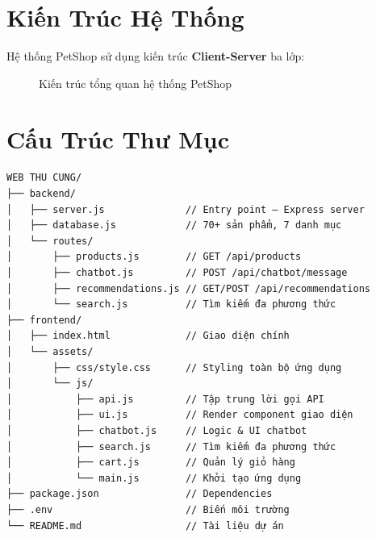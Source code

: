 \documentclass[12pt, a4paper]{report}
\begin{document}
\section{Kiến Trúc Hệ Thống}

Hệ thống PetShop sử dụng kiến trúc \textbf{Client-Server} ba lớp:

\begin{figure}[H]
    \centering
    \caption{Kiến trúc tổng quan hệ thống PetShop}
\end{figure}

\section{Cấu Trúc Thư Mục}

\begin{lstlisting}[style=jsStyle, caption={Cấu trúc thư mục dự án}]
WEB THU CUNG/
├── backend/
│   ├── server.js              // Entry point – Express server
│   ├── database.js            // 70+ sản phẩm, 7 danh mục
│   └── routes/
│       ├── products.js        // GET /api/products
│       ├── chatbot.js         // POST /api/chatbot/message
│       ├── recommendations.js // GET/POST /api/recommendations
│       └── search.js          // Tìm kiếm đa phương thức
├── frontend/
│   ├── index.html             // Giao diện chính
│   └── assets/
│       ├── css/style.css      // Styling toàn bộ ứng dụng
│       └── js/
│           ├── api.js         // Tập trung lời gọi API
│           ├── ui.js          // Render component giao diện
│           ├── chatbot.js     // Logic & UI chatbot
│           ├── search.js      // Tìm kiếm đa phương thức
│           ├── cart.js        // Quản lý giỏ hàng
│           └── main.js        // Khởi tạo ứng dụng
├── package.json               // Dependencies
├── .env                       // Biến môi trường
└── README.md                  // Tài liệu dự án
\end{lstlisting}
\end{document}
